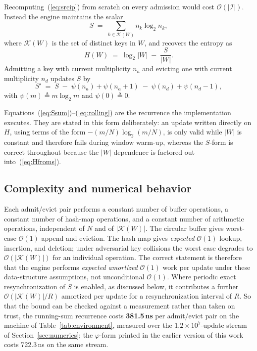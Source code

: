 \documentclass{ieeeaccess}
\begin{document}
Recomputing~(\ref{eq:srcip}) from scratch on every admission would cost $\mathcal{O}(|\mathcal{I}|)$. Instead the engine maintains the scalar
\begin{equation}
S \;=\; \sum_{k \in \mathcal{K}(W)} n_k \log_2 n_k ,
\label{eq:Ssum}
\end{equation}
where $\mathcal{K}(W)$ is the set of distinct keys in $W$, and recovers the entropy as
\begin{equation}
H(W) \;=\; \log_2 |W| \;-\; \frac{S}{|W|} .
\label{eq:Hfroms}
\end{equation}
Admitting a key with current multiplicity $n_a$ and evicting one with current multiplicity $n_d$ updates $S$ by
\begin{equation}
S' \;=\; S \;-\; \psi(n_a) + \psi(n_a{+}1) \;-\; \psi(n_d) + \psi(n_d{-}1),
\label{eq:rolling}
\end{equation}
with $\psi(m) \triangleq m \log_2 m$ and $\psi(0) \triangleq 0$.

Equations~(\ref{eq:Ssum})--(\ref{eq:rolling}) are the recurrence the implementation executes. They are stated in this form deliberately: an update written directly on $H$, using terms of the form $-(m/N)\log_2(m/N)$, is only valid while $|W|$ is constant and therefore fails during window warm-up, whereas the $S$-form is correct throughout because the $|W|$ dependence is factored out into~(\ref{eq:Hfroms}).

\subsection{Complexity and numerical behavior}
\label{sec:complexity}
Each admit/evict pair performs a constant number of buffer operations, a constant number of hash-map operations, and a constant number of arithmetic operations, independent of $N$ and of $|\mathcal{K}(W)|$. The circular buffer gives worst-case $\mathcal{O}(1)$ append and eviction. The hash map gives \emph{expected} $\mathcal{O}(1)$ lookup, insertion, and deletion; under adversarial key collisions the worst case degrades to $\mathcal{O}(|\mathcal{K}(W)|)$ for an individual operation. The correct statement is therefore that the engine performs \emph{expected amortized} $\mathcal{O}(1)$ work per update under these data-structure assumptions, not unconditional $\mathcal{O}(1)$. Where periodic exact resynchronization of $S$ is enabled, as discussed below, it contributes a further $\mathcal{O}(|\mathcal{K}(W)|/R)$ amortized per update for a resynchronization interval of $R$. So that the bound can be checked against a measurement rather than taken on trust, the running-sum recurrence costs \textbf{381.5\,ns} per admit/evict pair on the machine of Table~\ref{tab:environment}, measured over the $1.2\times10^{7}$-update stream of Section~\ref{sec:numerics}; the $\varphi$-form printed in the earlier version of this work costs 722.3\,ns on the same stream.
\end{document}
